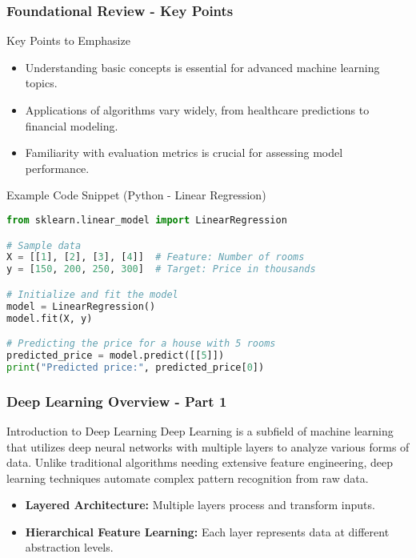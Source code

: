 \documentclass[aspectratio=169]{beamer}
\begin{document}
\begin{frame}[fragile]
    \frametitle{Foundational Review - Key Points}
    \begin{block}{Key Points to Emphasize}
        \begin{itemize}
            \item Understanding basic concepts is essential for advanced machine learning topics.
            \item Applications of algorithms vary widely, from healthcare predictions to financial modeling.
            \item Familiarity with evaluation metrics is crucial for assessing model performance.
        \end{itemize}
    \end{block}
    
    \begin{block}{Example Code Snippet (Python - Linear Regression)}
        \begin{lstlisting}[language=Python]
from sklearn.linear_model import LinearRegression

# Sample data
X = [[1], [2], [3], [4]]  # Feature: Number of rooms
y = [150, 200, 250, 300]  # Target: Price in thousands

# Initialize and fit the model
model = LinearRegression()
model.fit(X, y)

# Predicting the price for a house with 5 rooms
predicted_price = model.predict([[5]])
print("Predicted price:", predicted_price[0])
        \end{lstlisting}
    \end{block}
\end{frame}

\begin{frame}[fragile]
    \frametitle{Deep Learning Overview - Part 1}
    \begin{block}{Introduction to Deep Learning}
        Deep Learning is a subfield of machine learning that utilizes deep neural networks with multiple layers to analyze various forms of data. Unlike traditional algorithms needing extensive feature engineering, deep learning techniques automate complex pattern recognition from raw data.
    \end{block}
    
    \begin{itemize}
        \item \textbf{Layered Architecture:} Multiple layers process and transform inputs.
        \item \textbf{Hierarchical Feature Learning:} Each layer represents data at different abstraction levels.
    \end{itemize}
\end{frame}
\end{document}
